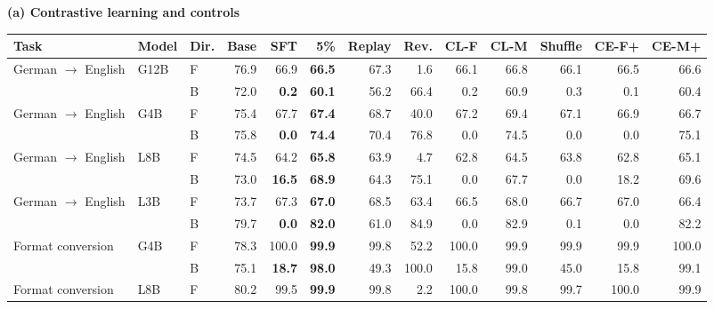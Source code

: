 \begin{table}[!t]
\centering\footnotesize
\textbf{(a) Contrastive learning and controls}\par\smallskip
\setlength{\tabcolsep}{3pt}
\begin{tabular}{lllrrrrrrrrrr}
\toprule
Task & Model & Dir. & Base & SFT & 5\% & Replay & Rev. & CL-F & CL-M & Shuffle & CE-F+ & CE-M+ \\
\midrule
German $\to$ English & G12B & F & 76.9 & 66.9 & \textcolor{blue!60!black}{\textbf{66.5}} & 67.3 & 1.6 & 66.1 & 66.8 & 66.1 & 66.5 & 66.6 \\
 &  & B & 72.0 & \textcolor{red!70!black}{\textbf{0.2}} & \textcolor{blue!60!black}{\textbf{60.1}} & 56.2 & 66.4 & 0.2 & 60.9 & 0.3 & 0.1 & 60.4 \\
\addlinespace[2pt]
German $\to$ English & G4B & F & 75.4 & 67.7 & \textcolor{blue!60!black}{\textbf{67.4}} & 68.7 & 40.0 & 67.2 & 69.4 & 67.1 & 66.9 & 66.7 \\
 &  & B & 75.8 & \textcolor{red!70!black}{\textbf{0.0}} & \textcolor{blue!60!black}{\textbf{74.4}} & 70.4 & 76.8 & 0.0 & 74.5 & 0.0 & 0.0 & 75.1 \\
\addlinespace[2pt]
German $\to$ English & L8B & F & 74.5 & 64.2 & \textcolor{blue!60!black}{\textbf{65.8}} & 63.9 & 4.7 & 62.8 & 64.5 & 63.8 & 62.8 & 65.1 \\
 &  & B & 73.0 & \textcolor{red!70!black}{\textbf{16.5}} & \textcolor{blue!60!black}{\textbf{68.9}} & 64.3 & 75.1 & 0.0 & 67.7 & 0.0 & 18.2 & 69.6 \\
\addlinespace[2pt]
German $\to$ English & L3B & F & 73.7 & 67.3 & \textcolor{blue!60!black}{\textbf{67.0}} & 68.5 & 63.4 & 66.5 & 68.0 & 66.7 & 67.0 & 66.4 \\
 &  & B & 79.7 & \textcolor{red!70!black}{\textbf{0.0}} & \textcolor{blue!60!black}{\textbf{82.0}} & 61.0 & 84.9 & 0.0 & 82.9 & 0.1 & 0.0 & 82.2 \\
\addlinespace[2pt]
Format conversion & G4B & F & 78.3 & 100.0 & \textcolor{blue!60!black}{\textbf{99.9}} & 99.8 & 52.2 & 100.0 & 99.9 & 99.9 & 99.9 & 100.0 \\
 &  & B & 75.1 & \textcolor{red!70!black}{\textbf{18.7}} & \textcolor{blue!60!black}{\textbf{98.0}} & 49.3 & 100.0 & 15.8 & 99.0 & 45.0 & 15.8 & 99.1 \\
\addlinespace[2pt]
Format conversion & L8B & F & 80.2 & 99.5 & \textcolor{blue!60!black}{\textbf{99.9}} & 99.8 & 2.2 & 100.0 & 99.8 & 99.7 & 100.0 & 99.9 \\

\end{tabular}
\end{table}
